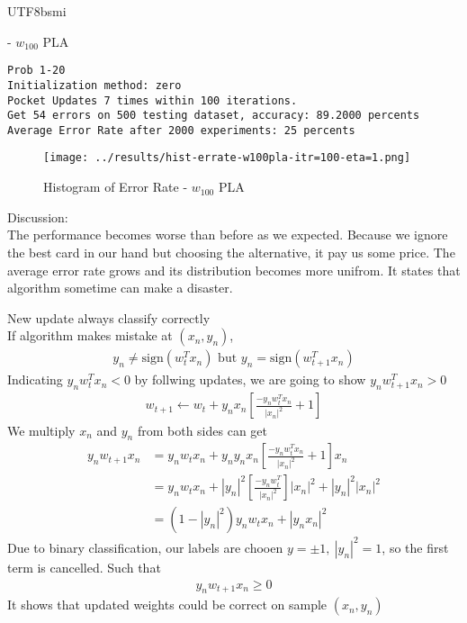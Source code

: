 \documentclass[12pt]{article}
\newenvironment{prob}[2][Prob.]{\begin{trivlist}
\item[\hskip \labelsep {\bfseries #1}\hskip \labelsep {\bfseries #2}]}{\end{trivlist}}
\begin{document}
\begin{CJK}{UTF8}{bsmi}
\begin{prob}{19}
\end{prob}

\begin{prob}{20} - $w_{100}$ PLA\\
\begin{lstlisting}
Prob 1-20
Initialization method: zero
Pocket Updates 7 times within 100 iterations.
Get 54 errors on 500 testing dataset, accuracy: 89.2000 percents
Average Error Rate after 2000 experiments: 25 percents
\end{lstlisting}
\begin{figure}[H]
	\centering
	\texttt{[image: ../results/hist-errate-w100pla-itr=100-eta=1.png]}
	\caption{Histogram of Error Rate - $w_{100}$ PLA}
	\label{fig-1-20}
\end{figure}
Discussion:\\
The performance becomes worse than before as we expected. Because we ignore the best card in our hand but choosing the alternative, it pay us some price. The average error rate grows and its distribution becomes more unifrom. It states that algorithm sometime can make a disaster.
\end{prob}

\begin{prob}{21} New update always classify correctly\\
If algorithm makes mistake at $(x_n, y_n)$, 
\begin{align*}
	y_n \ne \text{sign}(w^T_{t}x_n) \text{ but }  y_n = \text{sign}(w^T_{t+1}x_n) 
\end{align*}
Indicating $y_n w^T_t x_n < 0$ by follwing updates, we are going to show $y_n w^T_{t+1} x_n > 0$
\begin{align*}
	w_{t+1} \leftarrow w_t + y_nx_n [\frac{-y_nw^T_tx_n}{|x_n|^2}+1]
\end{align*}
We multiply $x_n$ and $y_n$ from both sides can get
\begin{align*}
	y_nw_{t+1}x_n &= y_nw_tx_n + y_ny_nx_n [\frac{-y_nw^T_tx_n}{|x_n|^2}+1] x_n\\
	&= y_nw_tx_n + |y_n|^2[\frac{-y_nw^T_t}{|x_n|^2}]|x_n|^2 + |y_n|^2|x_n|^2 \\
	&= (1-|y_n|^2)y_nw_tx_n + |y_nx_n|^2
\end{align*}
Due to binary classification, our labels are chooen $y = \pm 1, \ |y_n|^2 = 1$, so the first term is cancelled. Such that 
\begin{align*}
	y_nw_{t+1}x_n \ge 0
\end{align*}
It shows that updated weights could be correct on sample $(x_n, y_n)$
\end{prob}

\end{CJK} 
\end{document}
